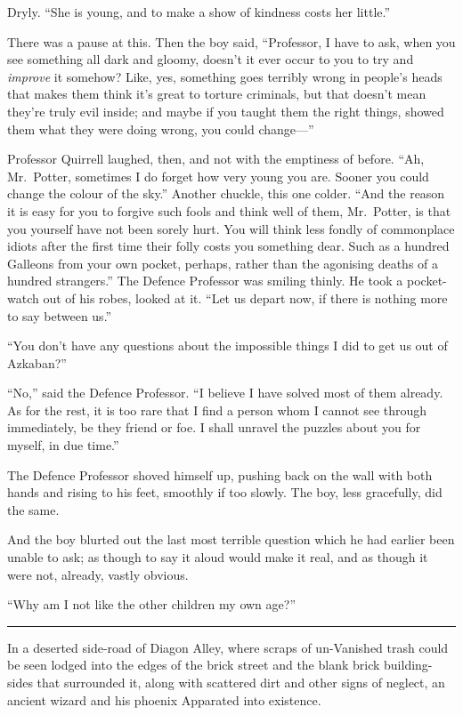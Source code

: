 Dryly. ``She is young, and to make a show of kindness costs her
little.''

There was a pause at this. Then the boy said, ``Professor, I have to
ask, when you see something all dark and gloomy, doesn't it ever occur
to you to try and \emph{improve} it somehow? Like, yes, something goes
terribly wrong in people's heads that makes them think it's great to
torture criminals, but that doesn't mean they're truly evil inside; and
maybe if you taught them the right things, showed them what they were
doing wrong, you could change---''

Professor Quirrell laughed, then, and not with the emptiness of before.
``Ah, Mr.~Potter, sometimes I do forget how very young you are. Sooner
you could change the colour of the sky.'' Another chuckle, this one
colder. ``And the reason it is easy for you to forgive such fools and
think well of them, Mr.~Potter, is that you yourself have not been
sorely hurt. You will think less fondly of commonplace idiots after the
first time their folly costs you something dear. Such as a hundred
Galleons from your own pocket, perhaps, rather than the agonising deaths
of a hundred strangers.'' The Defence Professor was smiling thinly. He
took a pocket-watch out of his robes, looked at it. ``Let us depart now,
if there is nothing more to say between us.''

``You don't have any questions about the impossible things I did to get
us out of Azkaban?''

``No,'' said the Defence Professor. ``I believe I have solved most of
them already. As for the rest, it is too rare that I find a person whom
I cannot see through immediately, be they friend or foe. I shall unravel
the puzzles about you for myself, in due time.''

The Defence Professor shoved himself up, pushing back on the wall with
both hands and rising to his feet, smoothly if too slowly. The boy, less
gracefully, did the same.

And the boy blurted out the last most terrible question which he had
earlier been unable to ask; as though to say it aloud would make it
real, and as though it were not, already, vastly obvious.

``Why am I not like the other children my own age?''

\begin{center}\rule{3in}{0.4pt}\end{center}

In a deserted side-road of Diagon Alley, where scraps of un-Vanished
trash could be seen lodged into the edges of the brick street and the
blank brick building-sides that surrounded it, along with scattered dirt
and other signs of neglect, an ancient wizard and his phoenix Apparated
into existence.

